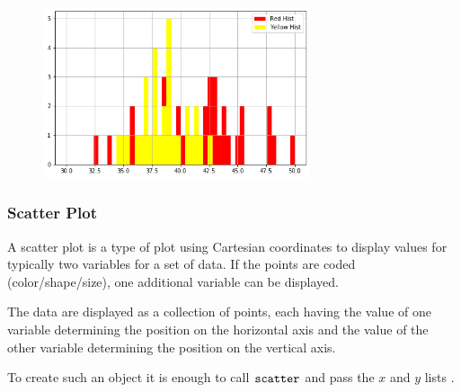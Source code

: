 \begin{figure}[h]
	\centering
	\includegraphics[width=0.7\textwidth]{figures/matplotlib_7_0.png}
\end{figure}

\subsubsection{Scatter Plot}\label{scatter}

A scatter plot is a type of plot using Cartesian coordinates to display
values for typically two variables for a set of data. If the points are
coded (color/shape/size), one additional variable can be displayed.

The data are displayed as a collection of points, each having the value
of one variable determining the position on the horizontal axis and the
value of the other variable determining the position on the vertical
axis.

To create such an object it is enough to call \(\tt{scatter}\) and pass
the \(x\) and \(y\) lists .

